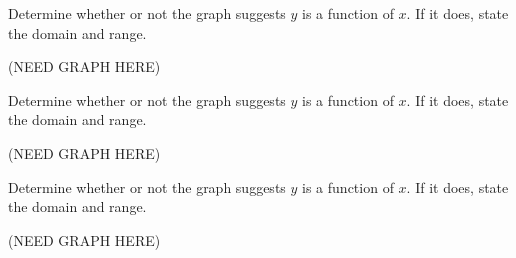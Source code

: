 \documentclass{ximera}
\begin{document}
%  
%  

\begin{problem}\label{graphfunctionfirstxy2}
    Determine whether or not the graph suggests $y$ is a function of $x$.  If it does, state the domain and range.

    (NEED GRAPH HERE)
\end{problem} 





\begin{problem}\label{graphfunctionfirstxy3}
    Determine whether or not the graph suggests $y$ is a function of $x$.  If it does, state the domain and range.

    (NEED GRAPH HERE)
\end{problem}


 
\begin{problem}\label{graphfunctionlastxy}
    Determine whether or not the graph suggests $y$ is a function of $x$.  If it does, state the domain and range.

    (NEED GRAPH HERE)
\end{problem} 
\end{document}
